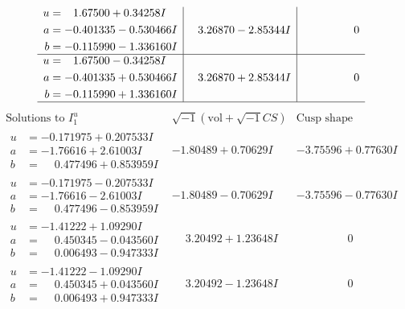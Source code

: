 \documentclass[1p]{elsarticle_modified}
\theoremstyle{definition}
\newcommand{\I}{\sqrt{-1}}
\begin{document}
$$\begin{array}{c|c|c}
\begin{aligned}
u &= \phantom{-}1.67500 + 0.34258 I \\
a &= -0.401335 - 0.530466 I \\
b &= -0.115990 - 1.336160 I\end{aligned}
 & \phantom{-}3.26870 - 2.85344 I & \phantom{-0.000000 } 0 \\ \hline\begin{aligned}
u &= \phantom{-}1.67500 - 0.34258 I \\
a &= -0.401335 + 0.530466 I \\
b &= -0.115990 + 1.336160 I\end{aligned}
 & \phantom{-}3.26870 + 2.85344 I & \phantom{-0.000000 } 0\\
 \hline 
 \end{array}$$\newpage$$\begin{array}{c|c|c}  
\text{Solutions to }I^u_{1}& \I (\text{vol} + \sqrt{-1}CS) & \text{Cusp shape}\\
 \hline 
\begin{aligned}
u &= -0.171975 + 0.207533 I \\
a &= -1.76616 + 2.61003 I \\
b &= \phantom{-}0.477496 + 0.853959 I\end{aligned}
 & -1.80489 + 0.70629 I & -3.75596 + 0.77630 I \\ \hline\begin{aligned}
u &= -0.171975 - 0.207533 I \\
a &= -1.76616 - 2.61003 I \\
b &= \phantom{-}0.477496 - 0.853959 I\end{aligned}
 & -1.80489 - 0.70629 I & -3.75596 - 0.77630 I \\ \hline\begin{aligned}
u &= -1.41222 + 1.09290 I \\
a &= \phantom{-}0.450345 - 0.043560 I \\
b &= \phantom{-}0.006493 - 0.947333 I\end{aligned}
 & \phantom{-}3.20492 + 1.23648 I & \phantom{-0.000000 } 0 \\ \hline\begin{aligned}
u &= -1.41222 - 1.09290 I \\
a &= \phantom{-}0.450345 + 0.043560 I \\
b &= \phantom{-}0.006493 + 0.947333 I\end{aligned}
 & \phantom{-}3.20492 - 1.23648 I & \phantom{-0.000000 } 0 \\ \hline\begin{aligned}

\end{aligned}
\end{array}$$
\end{document}
